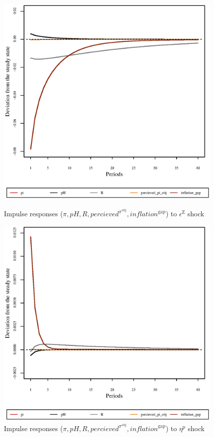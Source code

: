 \begin{figure}[h]
\begin{minipage}{0.5\textwidth}
\vspace*{-3em}
\centering
\includegraphics[width=0.99\textwidth, scale=0.55]{plots/plot_71.eps}
\caption{Impulse responses ($\pi, {p\!H}, R, {p\!e\!r\!c\!i\!e\!v\!e\!d}^{\pi^{\mathrm{obj}}}, {i\!n\!f\!l\!a\!t\!i\!o\!n}^{\mathrm{gap}}$) to $\epsilon^{\mathrm{Z}}$ shock}
\end{minipage}
\begin{minipage}{0.5\textwidth}
\vspace*{-3em}
\centering
\includegraphics[width=0.99\textwidth, scale=0.55]{plots/plot_72.eps}
\caption{Impulse responses ($\pi, {p\!H}, R, {p\!e\!r\!c\!i\!e\!v\!e\!d}^{\pi^{\mathrm{obj}}}, {i\!n\!f\!l\!a\!t\!i\!o\!n}^{\mathrm{gap}}$) to $\eta^{\mathrm{p}}$ shock}
\end{minipage}
\end{figure}

